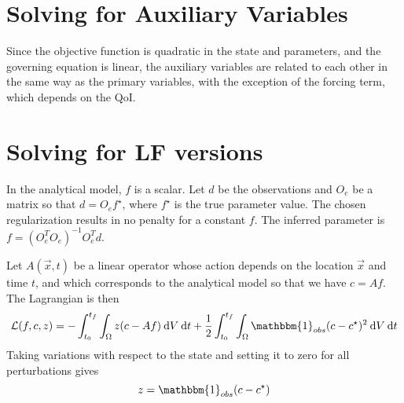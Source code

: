\documentclass[12pt, letterpaper]{article}
\newcommand{\dV}{{\:\textrm{d}V}}
\newcommand{\dt}{{\:\textrm{d}t}}
\begin{document}
\section{Solving for Auxiliary Variables}

Since the objective function is quadratic in the state and parameters, and the governing equation is linear, the auxiliary variables are related to each other in the same way as the primary variables, with the exception of the forcing term, which depends on the QoI.

\section{Solving for LF versions}

In the analytical model, $f$ is a scalar. Let $d$ be the observations and $O_e$ be a matrix so that $d=O_e f^\star$, where $f^\star$ is the true parameter value. The chosen regularization results in no penalty for a constant $f$. The inferred parameter is $f=(O_e^TO_e)^{-1}O_e^Td$.

Let $A(\vec{x},t)$ be a linear operator whose action depends on the location $\vec{x}$ and time $t$, and which corresponds to the analytical model so that we have $c=Af$. The Lagrangian is then
\[
\mathcal{L}(f,c,z) = -\int_{t_0}^{t_f}\int_\Omega z(c-Af) \dV\dt + \frac{1}{2}\int_{t_0}^{t_f}\int_\Omega \mathbbm{1}_{obs}(c-c^\star)^2 \dV\dt
\]
Taking variations with respect to the state and setting it to zero for all perturbations gives
\[
z=\mathbbm{1}_{obs}(c-c^\star)
\]
\end{document}
